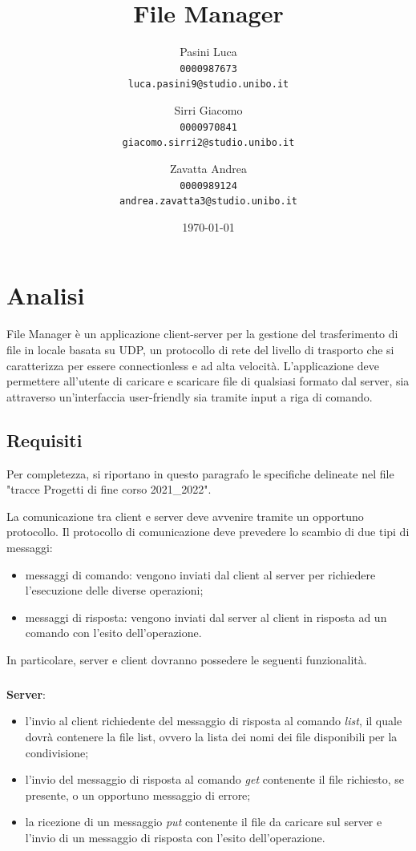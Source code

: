 \documentclass[a4paper,12pt]{report}
\title{File Manager}
\author{  
Pasini Luca\\
\texttt{0000987673}\\
\texttt{luca.pasini9@studio.unibo.it}
\and
Sirri Giacomo\\
\texttt{0000970841}\\
\texttt{giacomo.sirri2@studio.unibo.it}
\and
Zavatta Andrea\\
\texttt{0000989124}\\
\texttt{andrea.zavatta3@studio.unibo.it}
}
\date{\today}
\begin{document}
\maketitle

\tableofcontents

\chapter{Analisi}

File Manager è un applicazione client-server per la gestione del trasferimento di file in locale basata su UDP, un protocollo di rete del livello di trasporto che si caratterizza per essere connectionless e ad alta velocità.
L'applicazione deve permettere all'utente di caricare e scaricare file di qualsiasi formato dal server, sia attraverso un'interfaccia user-friendly sia tramite input a riga di comando.

\section{Requisiti}
Per completezza, si riportano in questo paragrafo le specifiche delineate nel file "tracce Progetti di fine corso 2021\_2022".

La comunicazione tra client e server deve avvenire tramite un opportuno protocollo. Il protocollo di comunicazione deve prevedere lo scambio di due tipi di messaggi: 
\begin{itemize}
    \item messaggi di comando: vengono inviati dal client al server per richiedere l’esecuzione delle diverse operazioni;
    \item messaggi di risposta: vengono inviati dal server al client in risposta ad un comando con l’esito dell’operazione.
\end{itemize}
In particolare, server e client dovranno possedere le seguenti funzionalità.
\paragraph{}
\textbf{Server}:
\begin{itemize}
    \item l’invio al client richiedente del messaggio di risposta al comando \textit{list}, il quale dovrà contenere la file list, ovvero la lista dei nomi dei file disponibili per la condivisione;
    \item l’invio del messaggio di risposta al comando \textit{get} contenente il file richiesto, se presente, o un opportuno messaggio di errore;
    \item la ricezione di un messaggio \textit{put} contenente il file da caricare sul server e l’invio di un messaggio di risposta con l’esito dell’operazione.
\end{itemize}
\end{document}
